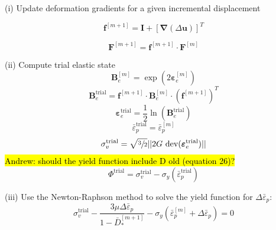 \documentclass[sn-mathphys,Numbered,draft]{sn-jnl}%
\newcommand{\bb}{\boldsymbol}
\begin{document}
\begin{algorithm}[htbp] \label{alg:lemaitre} \footnotesize
\SetAlgoLined
(i) Update deformation gradients for a given incremental displacement

\begin{equation}
  \mathbf{f}^{[m+1]} = \mathbf{I} + \left[ \bb{\nabla}(\Delta\textbf{u}) \right]^T \nonumber
\end{equation}

\begin{equation}
  \mathbf{F}^{[m+1]} = \mathbf{f}^{[m+1]} \cdot \mathbf{F}^{[m]}  \nonumber
\end{equation}

(ii) Compute trial elastic state
\begin{equation}
\mathbf{B}_{e}^{[m]} = \exp\left({2\boldsymbol{\varepsilon}_{e}^{[m]}}\right) \nonumber
\end{equation}
\begin{equation}
\mathbf{B}_{e}^{\text{trial}} = \mathbf{f}^{[m+1]} \cdot \mathbf{B}_{e}^{[m]} \cdot (\mathbf{f}^{[m+1]})^{T}\nonumber
\end{equation}
\begin{equation}
\boldsymbol{\varepsilon}_{e}^{\text{trial}} = \frac{1}{2} \ln(\textbf{B}_{e}^{\text{trial}}) \nonumber
\end{equation}
\begin{equation}
\bar{\varepsilon}^{\text{trial}}_p = \bar{\varepsilon}^{[m]}_p \nonumber
\end{equation}
\begin{equation}
\sigma_{v}^{\text{trial}} = \sqrt{\sfrac{3}{2}} || 2G\ \text{dev}(\boldsymbol{\varepsilon}_{e}^{\text{trial}})|| \nonumber
\end{equation}
\hl{Andrew: should the yield function include D old (equation 26)?}
\begin{equation}
\Phi^{\text{trial}} =  \sigma_{v}^{\text{trial}} - \sigma_{y}(\bar{\varepsilon}^{\text{trial}}_p) \nonumber 
\end{equation}

(iii) Use the Newton-Raphson method to solve the yield function for $\Delta\bar{\varepsilon}_p$:
\begin{equation}
	\sigma_{v}^{\text{trial}} 
	- \frac{ 3\mu \Delta\bar{\varepsilon}_p }{1 - \bar{D}^{[m+1]}_*}
	-\sigma_{y}(\bar{\varepsilon}^{[m]}_p + \Delta\bar{\varepsilon}_p) = 0 \nonumber
\end{equation}


\end{algorithm}
\end{document}
